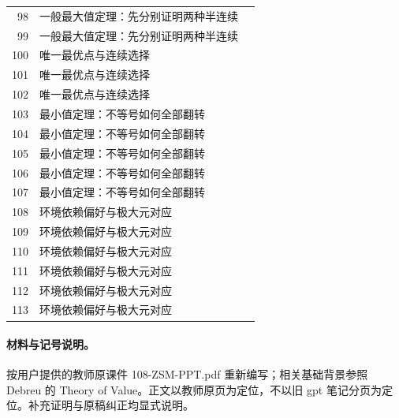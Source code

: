 \begin{longtable}{r p{.66\linewidth} r}
98 & 一般最大值定理：先分别证明两种半连续 & \pageref{g:108:96}\\

99 & 一般最大值定理：先分别证明两种半连续 & \pageref{g:108:96}\\

100 & 唯一最优点与连续选择 & \pageref{g:108:100}\\

101 & 唯一最优点与连续选择 & \pageref{g:108:100}\\

102 & 唯一最优点与连续选择 & \pageref{g:108:100}\\

103 & 最小值定理：不等号如何全部翻转 & \pageref{g:108:103}\\

104 & 最小值定理：不等号如何全部翻转 & \pageref{g:108:103}\\

105 & 最小值定理：不等号如何全部翻转 & \pageref{g:108:103}\\

106 & 最小值定理：不等号如何全部翻转 & \pageref{g:108:103}\\

107 & 最小值定理：不等号如何全部翻转 & \pageref{g:108:103}\\

108 & 环境依赖偏好与极大元对应 & \pageref{g:108:108}\\

109 & 环境依赖偏好与极大元对应 & \pageref{g:108:108}\\

110 & 环境依赖偏好与极大元对应 & \pageref{g:108:108}\\

111 & 环境依赖偏好与极大元对应 & \pageref{g:108:108}\\

112 & 环境依赖偏好与极大元对应 & \pageref{g:108:108}\\

113 & 环境依赖偏好与极大元对应 & \pageref{g:108:108}\\

\bottomrule\end{longtable}

\paragraph{材料与记号说明。}按用户提供的教师原课件 108-ZSM-PPT.pdf 重新编写；相关基础背景参照 Debreu 的 Theory of Value。正文以教师原页为定位，不以旧 gpt 笔记分页为定位。补充证明与原稿纠正均显式说明。